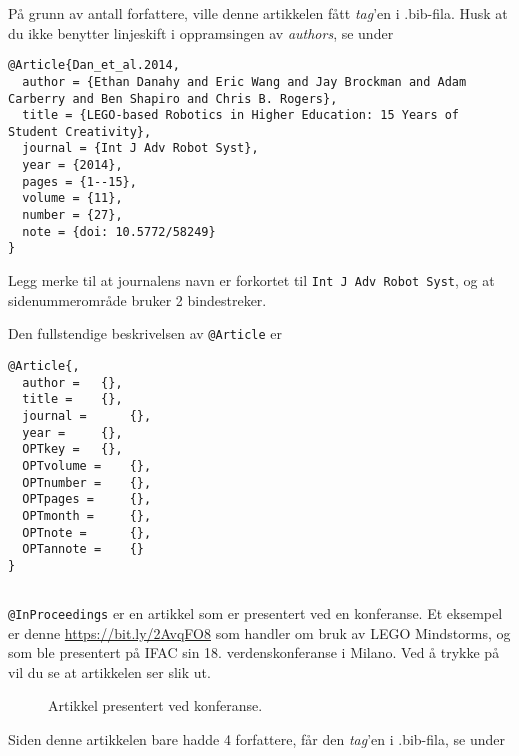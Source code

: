 \newpage

På grunn av antall forfattere, ville denne artikkelen
fått {\em tag}'en   i 
.bib-fila. Husk at du ikke benytter linjeskift i
  oppramsingen av {\em authors}, se under

\begin{boxedminipage}{200mm}
{\footnotesize{
\begin{verbatim}
@Article{Dan_et_al.2014,
  author = {Ethan Danahy and Eric Wang and Jay Brockman and Adam Carberry and Ben Shapiro and Chris B. Rogers},
  title = {LEGO-based Robotics in Higher Education: 15 Years of Student Creativity},
  journal = {Int J Adv Robot Syst},
  year = {2014},
  pages = {1--15},
  volume = {11},
  number = {27},
  note = {doi: 10.5772/58249}
}
\end{verbatim}
}}
\end{boxedminipage}

Legg merke til at journalens navn er forkortet til {\tt Int J Adv
  Robot  Syst}, og at sidenummerområde bruker 2 bindestreker.



Den fullstendige beskrivelsen av {\tt @Article} er

\begin{verbatim}
@Article{,
  author = 	 {},
  title = 	 {},
  journal = 	 {},
  year = 	 {},
  OPTkey = 	 {},
  OPTvolume = 	 {},
  OPTnumber = 	 {},
  OPTpages = 	 {},
  OPTmonth = 	 {},
  OPTnote = 	 {},
  OPTannote = 	 {}
}
\end{verbatim}

\newpage

\subsection{}
{\tt @InProceedings} er en artikkel som er 
  presentert ved en konferanse. Et eksempel er denne
  {\color{red}\href{https://bit.ly/2AvqFO8}{https://bit.ly/2AvqFO8}}
  som handler om bruk av LEGO Mindstorms, og som ble presentert på IFAC
  sin 18. verdenskonferanse i Milano. Ved å trykke på
  {\color{red}{Download full text in PDF}} vil du se at artikkelen ser
  slik ut.
\begin{figure}[H]
  \centering
  \caption{Artikkel presentert ved konferanse.} 
  \label{fig:proceedings}
\end{figure}

\newpage

Siden denne artikkelen bare hadde 4 forfattere, 
får den {\em tag}'en  
i .bib-fila, se under


